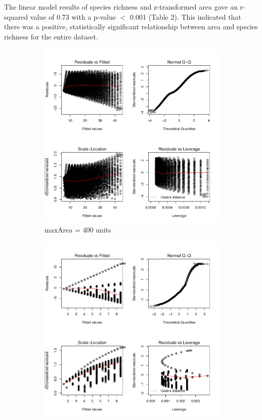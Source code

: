 \documentclass{article}
\begin{document}
\noindent The linear model results of species richness and z-transformed area gave an r-squared value of 0.73 with a p-value $<$ 0.001 (Table 2). This indicated that there was a positive, statistically significant relationship between area and species richness for the entire dataset. \bigskip

\begin{figure}[h!]
  \centering
  \begin{subfigure}[b]{0.4\linewidth}
    \includegraphics[width=\linewidth]{../../../Results/Simulation2/AreaSpeciesLmPlot_1.pdf}
    \caption{maxArea = 400 units}
  \end{subfigure}
  \begin{subfigure}[b]{0.4\linewidth}
    \includegraphics[width=\linewidth]{../../../Results/Simulation2/AreaSpeciesLmPlot_20.pdf}

\end{subfigure}
\end{figure}
\end{document}
